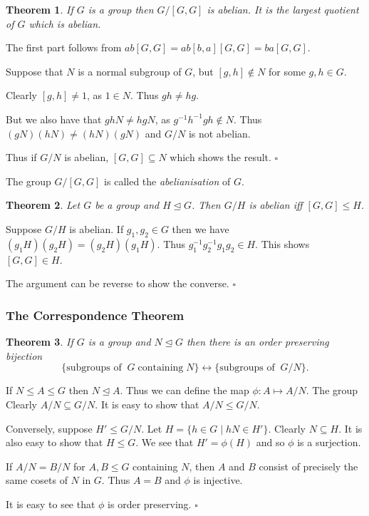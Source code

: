 \documentclass[10pt]{article}
\newtheorem{theorem}{Theorem}[section]
\newenvironment{proof}[1][Proof]{\begin{trivlist}
\item[\hskip \labelsep {\itshape #1}]}{\end{trivlist}}
\newenvironment{definition}[1][Definition]{\begin{trivlist}
\item[\hskip \labelsep {\bfseries #1}]}{\end{trivlist}}
\begin{document}
\begin{theorem}
If $G$ is a group then $G/[G, G]$ is abelian. It is the largest quotient of $G$ which is abelian.
\end{theorem}

\begin{proof}
The first part follows from $ab[G, G] = ab[b, a][G, G] = ba[G, G]$.

Suppose that $N$ is a normal subgroup of $G$, but $[g, h] \notin N$ for some $g, h \in G$.

Clearly $[g, h] \neq 1$, as $1 \in N$. Thus $gh \neq hg$.

But we also have that $ghN \neq hgN$, as $g^{-1}h^{-1}gh \notin N$. Thus $(gN)(hN) \neq (hN)(gN)$ and $G/N$ is not abelian.

Thus if $G/N$ is abelian, $[G, G] \subseteq N$ which shows the result. $\square$
\end{proof}

\begin{definition}
The group $G/[G, G]$ is called the \emph{abelianisation} of $G$.
\end{definition}

\begin{theorem}
Let $G$ be a group and $H \mathrel{\unlhd} G$. Then $G/H$ is abelian iff $[G, G] \leq H$.
\end{theorem}

\begin{proof}
Suppose $G/H$ is abelian. If $g_1, g_2 \in G$ then we have $(g_1H)(g_2H) = (g_2H)(g_1H)$. Thus $g_1^{-1}g_2^{-1}g_1g_2 \in H$. This shows $[G, G] \in H$. 

The argument can be reverse to show the converse. $\square$
\end{proof}

\subsubsection{The Correspondence Theorem}

\begin{theorem}
If $G$ is a group and $N \mathrel{\unlhd} G$ then there is an order preserving bijection
$$\{\mbox{subgroups of}\;\;G\;\mbox{containing}\;N \} \leftrightarrow \{\mbox{subgroups of}\;\;G/N\}.$$ 
\end{theorem}

\begin{proof}
If $N \leq A \leq G$ then $N \mathrel{\unlhd} A$. Thus we can define the map $\phi : A \mapsto A/N$. The group Clearly $A/N \subseteq G/N$. It is easy to show that $A/N \leq G/N$.

Conversely, suppose $H' \leq G/N$. Let $H = \{h \in G \;|\; hN \in H'\}$. Clearly $N \subseteq H$. It is also easy to show that $H \leq G$. We see that $H' = \phi(H)$ and so $\phi$ is a surjection.

If $A/N = B/N$ for $A, B \leq G$ containing $N$, then $A$ and $B$ consist of precisely the same cosets of $N$ in $G$. Thus $A = B$ and $\phi$ is injective.

It is easy to see that $\phi$ is order preserving. $\square$
\end{proof}
\end{document}
